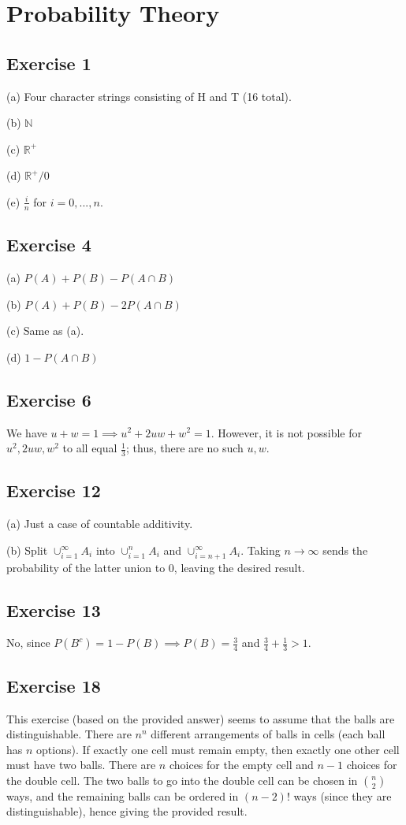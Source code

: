 \section{Probability Theory}

\subsection{Exercise 1}
(a) Four character strings consisting of H and T (16 total).

(b) $\mathbb{N}$

(c) $\mathbb{R}^+$

(d) $\mathbb{R}^+ / 0$

(e) $\frac{i}{n}$ for $i = 0, ..., n$.

\subsection{Exercise 4}
(a) $P(A) + P(B) - P(A \cap B)$ 

(b) $P(A) + P(B) - 2P(A \cap B)$ 

(c) Same as (a).

(d) $1 - P(A \cap B)$

\subsection{Exercise 6}
We have $u + w = 1 \implies u^2 + 2uw + w^2 = 1$. However, it is not possible for
$u^2, 2uw, w^2$ to all equal $\frac{1}{3}$; thus, there are no such $u, w$.

\subsection{Exercise 12}
(a) Just a case of countable additivity.

(b) Split $\cup_{i = 1}^{\infty} A_i$ into $\cup_{i = 1}^{n} A_i$ and $\cup_{i = n + 1}^{\infty} A_i$.
Taking $n \to  \infty$ sends the probability of the latter union to 0, leaving the
desired result.

\subsection{Exercise 13}
No, since $P(B^c) = 1 - P(B) \implies P(B) = \frac{3}{4}$ and $\frac{3}{4} + \frac{1}{3} > 1$.

\subsection{Exercise 18}
This exercise (based on the provided answer) seems to assume that the balls are distinguishable. 
There are $n^n$ different arrangements of balls in cells (each ball has $n$ options). If 
exactly one cell must remain empty, then exactly one other cell must have two balls. There are
$n$ choices for the empty cell and $n - 1$ choices for the double cell. The two balls to go into
the double cell can be chosen in $\binom{n}{2}$ ways, and the remaining balls can be ordered in
$(n - 2)!$ ways (since they are distinguishable), hence giving the provided result.

